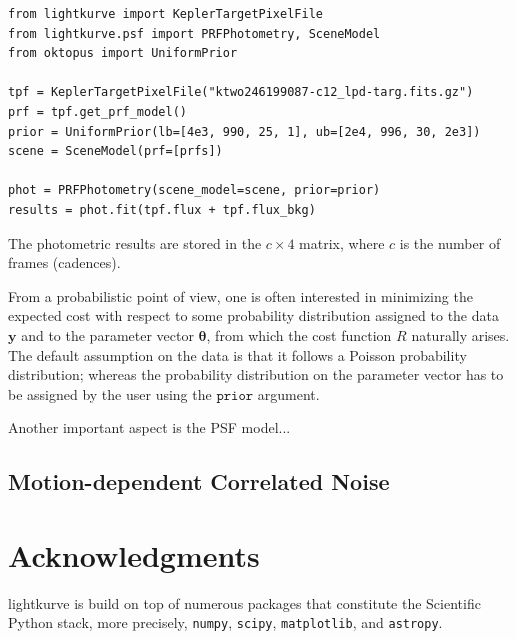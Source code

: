 \documentclass{article}
\begin{document}
\begin{verbatim}
from lightkurve import KeplerTargetPixelFile
from lightkurve.psf import PRFPhotometry, SceneModel
from oktopus import UniformPrior

tpf = KeplerTargetPixelFile("ktwo246199087-c12_lpd-targ.fits.gz")
prf = tpf.get_prf_model()
prior = UniformPrior(lb=[4e3, 990, 25, 1], ub=[2e4, 996, 30, 2e3])
scene = SceneModel(prf=[prfs])

phot = PRFPhotometry(scene_model=scene, prior=prior)
results = phot.fit(tpf.flux + tpf.flux_bkg)
\end{verbatim}

The photometric results are stored in the $c \times 4$ matrix, where $c$ is the
number of frames (cadences).

From a probabilistic point of view, one is often interested in minimizing the
expected cost with respect to some probability distribution assigned to the data
$\bm{y}$ and to the parameter vector $\bm{\theta}$, from which the cost function
$R$ naturally arises. The default assumption on the data is that it follows
a Poisson probability distribution; whereas the probability distribution on the
parameter vector has to be assigned by the user using the $\texttt{prior}$
argument.

Another important aspect is the PSF model...

\subsection{Motion-dependent Correlated Noise}
\label{subsection:motion}

\section{Acknowledgments}
lightkurve is build on top of numerous packages that constitute the Scientific Python
stack, more precisely, \texttt{numpy}, \texttt{scipy}, \texttt{matplotlib}, and
\texttt{astropy}.
\end{document}
